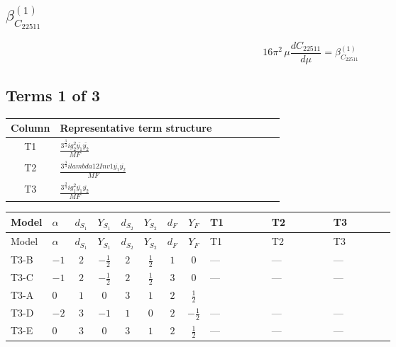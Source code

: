 \documentclass[8pt]{article}
\begin{document}
\begin{landscape}
\section*{$\beta_{C_{22511}}^{(1)}$}
\[16\pi^2\,\mu\frac{d C_{22511}}{d\mu}=\beta_{C_{22511}}^{(1)}\]
\subsection*{Terms 1 of 3}
\begin{center}
\begin{tabular}{@{}c >{\raggedright\arraybackslash}p{0.82\linewidth}@{}}
\toprule
Column & Representative term structure \\
\midrule
T1 & \(\displaystyle \frac{3^{\frac{3}{4}} i g_{2}^{2} \overline{y_{1}} \overline{y_{2}}}{MF}\) \\
\midrule
T2 & \(\displaystyle \frac{3^{\frac{3}{4}} i lambda12Inv1 \overline{y_{1}} \overline{y_{2}}}{MF}\) \\
\midrule
T3 & \(\displaystyle \frac{3^{\frac{3}{4}} i g_{1}^{2} \overline{y_{1}} \overline{y_{2}}}{MF}\) \\
\midrule
\bottomrule
\end{tabular}
\end{center}
\smallskip
\tiny
\begin{longtable}{@{}llcccccc >{\raggedright\arraybackslash}p{0.21\linewidth} >{\raggedright\arraybackslash}p{0.21\linewidth} >{\raggedright\arraybackslash}p{0.21\linewidth}@{}}
\toprule
Model & $\alpha$ & $d_{S_1}$ & $Y_{S_1}$ & $d_{S_2}$ & $Y_{S_2}$ & $d_F$ & $Y_F$ & T1 & T2 & T3 \\
\midrule
\endfirsthead
\toprule
Model & $\alpha$ & $d_{S_1}$ & $Y_{S_1}$ & $d_{S_2}$ & $Y_{S_2}$ & $d_F$ & $Y_F$ & T1 & T2 & T3 \\
\midrule
\endhead
T3-B & $-1$ & $2$ & $-\frac{1}{2}$ & $2$ & $\frac{1}{2}$ & $1$ & $0$ & --- & --- & --- \\
\midrule
T3-C & $-1$ & $2$ & $-\frac{1}{2}$ & $2$ & $\frac{1}{2}$ & $3$ & $0$ & --- & --- & --- \\
\midrule
T3-A & $0$ & $1$ & $0$ & $3$ & $1$ & $2$ & $\frac{1}{2}$ & \scriptsize\adjustbox{max width=\linewidth}{$\begin{gathered} - \frac{11 \cdot 3^{\frac{3}{4}} i g_{2}^{2} \overline{y_{1}} \overline{y_{2}}}{8 MF}\end{gathered}$} & \scriptsize\adjustbox{max width=\linewidth}{$\begin{gathered} - \frac{3^{\frac{3}{4}} i lambda12Inv1 \overline{y_{1}} \overline{y_{2}}}{6 MF}\end{gathered}$} & \scriptsize\adjustbox{max width=\linewidth}{$\begin{gathered} - \frac{3^{\frac{3}{4}} i g_{1}^{2} \overline{y_{1}} \overline{y_{2}}}{8 MF}\end{gathered}$} \\
\midrule
T3-D & $-2$ & $3$ & $-1$ & $1$ & $0$ & $2$ & $-\frac{1}{2}$ & --- & --- & --- \\
\midrule
T3-E & $0$ & $3$ & $0$ & $3$ & $1$ & $2$ & $\frac{1}{2}$ & --- & --- & --- \\
\midrule
\bottomrule
\end{longtable}
\clearpage

\end{landscape}
\end{document}
